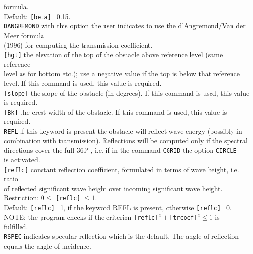\documentclass[12pt]{book}
\begin{document}
\begin{tabbing}
                    formula.\\
                    Default: {\tt [beta]}=0.15.\-\\
{\tt DANGREMOND} \> with this option the user indicates to use the d'Angremond/Van der Meer formula\+\\
                    (1996) for computing the transmission coefficient.\-\\
{\tt [hgt]}      \> the elevation of the top of the obstacle above reference level (same reference\+\\
                    level as for bottom etc.); use a negative value if the top is below that reference\\
                    level. If this command is used, this value is required.\-\\
{\tt [slope]}    \> the slope of the obstacle (in degrees). If this command is used, this value is required.\\
{\tt [Bk]}       \> the crest width of the obstacle. If this command is used, this value is required.\\
{\tt REFL}       \> if this keyword is present the obstacle will reflect wave energy (possibly in\+\\
                    combination with transmission). Reflections will be computed only if the spectral\\
                    directions cover the full 360$^{\rm o}$, i.e. if in the command {\tt CGRID} the option {\tt CIRCLE}\\
                    is activated.\-\\
{\tt [reflc]}    \> constant reflection coefficient, formulated in terms of wave height, i.e. ratio\+\\
                    of reflected significant wave height over incoming significant wave height.\\
                    Restriction: $0 \leq$ {\tt [reflc]} $\leq 1$.\\
                    Default: {\tt [reflc]}=1, if the keyword REFL is present, otherwise {\tt [reflc]}=0.\\
                    NOTE: the program checks if the criterion {\tt [reflc]}$^2 + ${\tt [trcoef]}$^2 \leq 1$ is\\
                    fulfilled.\-\\
{\tt RSPEC}      \> indicates specular reflection which is the default. The angle of reflection\+\\
                    equals the angle of incidence.\-\\

\end{tabbing}
\end{document}
